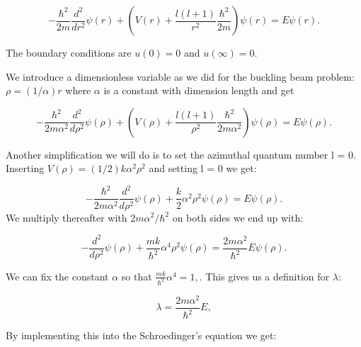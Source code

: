 \documentclass[twoside,onecolumn]{article}
\begin{document}
\begin{equation*}
  -\frac{\hbar^2}{2 m} \frac{d^2}{dr^2} \psi(r) 
       + \left ( V(r) + \frac{l (l + 1)}{r^2}\frac{\hbar^2}{2 m}
                                    \right ) \psi(r)  = E \psi(r) .
\end{equation*}
% 
\bigskip

The boundary conditions are $u(0)=0$ and $u(\infty)= 0$.

We introduce a dimensionless variable as we did for the buckling beam problem:  $\rho = (1/\alpha) r$
where $\alpha$ is a constant with dimension length and get
% 
\bigskip


\begin{equation*}
  -\frac{\hbar^2}{2 m \alpha^2} \frac{d^2}{d\rho^2} \psi(\rho) 
       + \left ( V(\rho) + \frac{l (l + 1)}{\rho^2}
         \frac{\hbar^2}{2 m\alpha^2} \right )\psi(\rho)  = E \psi(\rho) .
\end{equation*}
% 
\bigskip

Another simplification we will do is to set the azimuthal quantum number l = 0. 
Inserting $V(\rho) = (1/2) k \alpha^2\rho^2$ and setting l = 0 we get: 

\bigskip

\begin{equation*}
  -\frac{\hbar^2}{2 m \alpha^2} \frac{d^2}{d\rho^2} \psi(\rho) 
       + \frac{k}{2} \alpha^2\rho^2\psi(\rho)  = E \psi(\rho) .
\end{equation*}
We multiply thereafter with $2m\alpha^2/\hbar^2$ on both sides we end up with:

\bigskip

\begin{equation*}
  -\frac{d^2}{d\rho^2} \psi(\rho) 
       + \frac{mk}{\hbar^2} \alpha^4\rho^2\psi(\rho)  = \frac{2m\alpha^2}{\hbar^2}E \psi(\rho) .
\end{equation*}

\bigskip

We can fix the constant $\alpha$ so that $\frac{mk}{\hbar^2} \alpha^4 = 1,$. This gives us a definition for $\lambda$:

\bigskip

\begin{equation*}
\lambda = \frac{2m\alpha^2}{\hbar^2}E,
\end{equation*}

\bigskip

By implementing this into the Schroedinger’s equation we get: 

\bigskip
\end{document}
